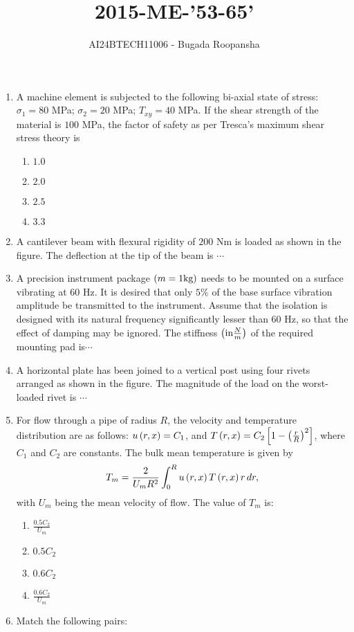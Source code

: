 \documentclass[journal,12pt,twocolumn]{IEEEtran}
\theoremstyle{remark}
\begin{document}

\vspace{3cm}
\title{2015-ME-'53-65'}
\author{AI24BTECH11006 - Bugada Roopansha}
\maketitle

\begin{enumerate}[start=53]
 
    \item A machine element is subjected to the following bi-axial state of stress: $\sigma_1 = 80$ MPa; $\sigma_2 = 20$ MPa; $T_{xy} = 40$ MPa. If the shear strength of the material is $100$ MPa, the factor of safety as per Tresca's maximum shear stress theory is
    \begin{enumerate}
        \item $1.0$
        \item $2.0$
        \item $2.5$
        \item $3.3$
    \end{enumerate} 


    \item A cantilever beam with flexural rigidity of $200$ Nm is loaded as shown in the figure. The deflection  at the tip of the beam is $\cdots$



 \item A precision instrument package $\left(m = 1 \text{kg}\right)$ needs to be mounted on a surface vibrating at $60$ Hz. It is desired that only $5\%$ of the base surface vibration amplitude be transmitted to the instrument. Assume that the isolation is designed with its natural frequency significantly lesser than $60$ Hz, so that the effect of damping may be ignored. The stiffness $\left(\text{in}\frac{N}{m}\right)$ of the required mounting pad is$\cdots$

\item A horizontal plate has been joined to a vertical post using four rivets arranged as shown in the figure. The magnitude of the load on the worst-loaded rivet  is $\cdots$



 \item For flow through a pipe of radius $R$, the velocity and temperature distribution are as follows:
    $u\left(r, x\right) = C_1$, and $T\left(r, x\right) = C_2 {}\left[1 - \left(\frac{r}{R}\right)^2\right]$, where $C_1$ and $C_2$ are constants. The bulk mean temperature is given by
    $$T_m = \frac{2}{U_m R^2} \int_0^R u\left(r,x\right) T\left(r, x\right) r \, dr,$$ 
    with $U_m$ being the mean velocity of flow. The value of $T_m$ is:
    \begin{enumerate}
        \item $\frac{0.5C_2}{U_m}$
        \item $0.5C_2$
        \item $0.6C_2$
        \item $\frac{0.6C_2}{U_m}$
    \end{enumerate}
\item Match the following pairs:
	
    

\end{enumerate}
\end{document}
